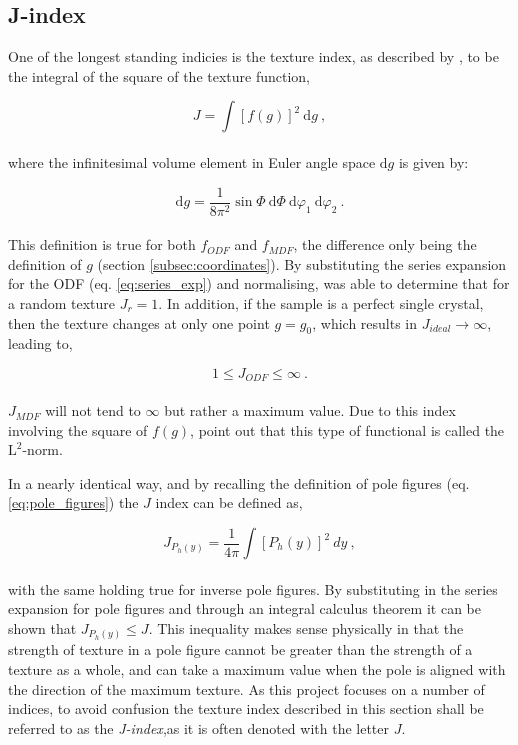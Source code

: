 \documentclass[a4paper,12pt]{report}
\numberwithin{equation}{chapter}
\begin{document}
\subsection{J-index} \label{subsec:j-index}
 One of the longest standing indicies is the texture index, as described by \cite{bunge1982texture}, to be the integral of the square of the texture function,

\begin{equation}
J = \int [ f(g) ]^2\ \mathrm{d}g \ ,
\end{equation} 
\\
where the infinitesimal volume element in Euler angle space $\mathrm{d}g$ is given by:

\begin{equation}
\mathrm{d}g = \frac{1}{8\pi^2} \sin\Phi\ \mathrm{d}\Phi\ \mathrm{d}\varphi_1\ \mathrm{d}\varphi_2\ .
\end{equation} 
\\
This definition is true for both $f_{ODF}$ and $f_{MDF}$, the difference only being the definition of $g$ (section \ref{subsec:coordinates}). By substituting the series expansion for the ODF (eq. \ref{eq:series_exp})  and normalising, \cite{bunge1982texture} was able to determine that for a random texture $J_r = 1$. In addition, if the sample is a perfect single crystal, then the texture changes at only one point $g = g_0$, which results in $J_{ideal} \to \infty$, leading to,




\begin{equation}
1 \leq J_{ODF} \leq \infty\ .
\end{equation}
\\
$J_{MDF}$ will not tend to $\infty$ but rather a maximum value. Due to this index involving the square of $f(g)$, \cite{Mainprice} point out that this type of functional is called the $\mathrm{L^2}$-norm. 

In a nearly identical way, and by recalling the definition of pole figures (eq. \ref{eq:pole_figures}) the $J$ index can be defined as,
 
\begin{equation}
J_{P_h(y)} = \frac{1}{4\pi} \int [ P_{h}(y) ]^2\ dy\ ,
\end{equation}
\\
with the same holding true for inverse pole figures. By substituting in the series expansion for pole figures and through an integral calculus theorem \citep[p.90]{bunge1982texture} it can be shown that $J_{P_h(y)} \leq J$. This inequality makes sense physically in that the strength of texture in a pole figure cannot be greater than the strength of a texture as a whole, and can take a maximum value when the pole is aligned with the direction of the maximum texture. As this project focuses on a number of indices, to avoid confusion the texture index described in this section shall be referred to as the \emph{J-index},as it is often denoted with the letter $J$.
\end{document}
